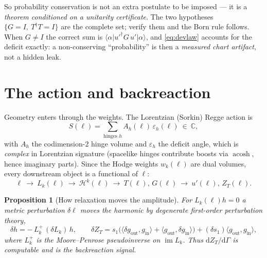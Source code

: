 \documentclass[11pt]{article}
\DeclareMathOperator{\im}{im}
\newcommand{\C}{\mathbb{C}}
\newcommand{\ket}[1]{\lvert #1 \rangle}
\newcommand{\bra}[1]{\langle #1 \rvert}
\newcommand{\inner}[2]{\langle #1, #2 \rangle}
\newcommand{\dd}{\mathrm{d}}
\newcommand{\harm}{\mathcal{H}}              %
\newcommand{\gin}{g_{\mathrm{in}}}
\newcommand{\gout}{g_{\mathrm{out}}}
\newcommand{\ZT}{Z_{T}}
\theoremstyle{plain}
\newtheorem{proposition}[theorem]{Proposition}
\theoremstyle{definition}
\begin{document}
So probability conservation is not an extra postulate to be imposed --- it is a \emph{theorem
conditioned on a unitarity certificate}. The two hypotheses $\{G=I,\ T^\dagger T=I\}$ are the
complete set; verify them and the Born rule follows. When $G\neq I$ the correct sum is
$\bra{\alpha}u'^\dagger G\,u'\ket{\alpha}$, and \eqref{eq:devlaw} accounts for the deficit
exactly: a non-conserving ``probability'' is then a \emph{measured chart artifact}, not a
hidden leak.

\section{The action and backreaction}
\label{sec:backreaction}

Geometry enters through the weights. The Lorentzian (Sorkin) Regge action is
\begin{equation}
  S(\ell) = \sum_{\text{hinges }h} A_h(\ell)\,\varepsilon_h(\ell)\ \in\ \C,
  \label{eq:regge}
\end{equation}
with $A_h$ the codimension-2 hinge volume and $\varepsilon_h$ the deficit angle, which is
\emph{complex} in Lorentzian signature (spacelike hinges contribute boosts via $\operatorname{acosh}$,
hence imaginary parts). Since the Hodge weights $w_k(\ell)$ are dual volumes, every downstream
object is a functional of $\ell$:
\begin{equation}
  \ell \ \longrightarrow\ L_k(\ell)\ \longrightarrow\ \harm^k(\ell)
       \ \longrightarrow\ T(\ell),\,G(\ell)\ \longrightarrow\ u'(\ell),\,\ZT(\ell).
\end{equation}

\begin{proposition}[How relaxation moves the amplitude]
\label{prop:perturb}
For $L_k(\ell)h=0$ a metric perturbation $\delta\ell$ moves the harmonic by degenerate
first-order perturbation theory,
\begin{equation}
  \delta h = -\,L_k^{+}\,(\delta L_k)\,h, \qquad
  \delta\ZT = s_1\big(\inner{\delta\gout}{\gin}+\inner{\gout}{\delta\gin}\big)
              + (\delta s_1)\inner{\gout}{\gin},
  \label{eq:perturb}
\end{equation}
where $L_k^{+}$ is the Moore--Penrose pseudoinverse on $\im L_k$. Thus $\dd\ZT/\dd\Gamma$ is
computable and is the backreaction signal.
\end{proposition}
\end{document}
